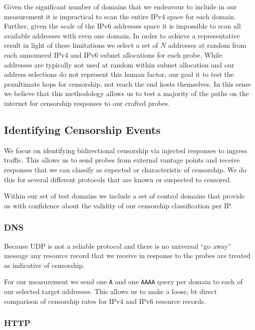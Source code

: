 Given the significant number of domains that we endeavour to include in our
measurement it is impractical to scan the entire IPv4 space for each domain.
Further, given the scale of the IPv6 addresses space it is impossible to scan
all available addresses with even one domain. In order to achieve a
representative result in light of these limitations we select a set of $N$
addresses at random from each announced IPv4 and IPv6 subnet allocations for
each probe. While addresses are typically not used at random within subnet
allocation and our address selections do not represent this human factor, our
goal it to test the penultimate hops for censorship, not reach the end hosts
themselves. In this sense we believe that this methodology allows us to test a
majority of the paths on the internet for censorship responses to our crafted
probes.

\subsection{Identifying Censorship Events}

We focus on identifying bidirectional censorship via injected responses to
ingress traffic. This allows us to send probes from external vantage points and
receive responses that we can classify as expected or characteristic of
censorship. We do this for several different protocols that are known or
suspected to censored.

Within our set of test domains we include a set of control domains that provide
us with confidence about the validity of our censorship classification per IP.

\subsubsection{DNS} \label{sec:methodology:censorship}

Because UDP is not a reliable protocol and there is no universal ``go away''
message any resource record that we receive in response to the probes are
treated as indicative of censorship.

For our measurement we send one {\tt A} and one {\tt AAAA} query per domain to
each of our selected target addresses. This allows us to make a loose, bt direct
comparison of censorship rates for IPv4 and IPv6 resource records.

\subsubsection{HTTP}

